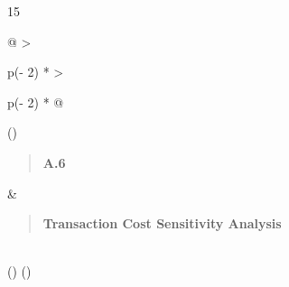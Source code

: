 \documentclass[
]{article}
\begin{document}
15

\begin{longtable}[]{@{}
  >{\raggedright\arraybackslash}p{(\columnwidth - 2\tabcolsep) * }
  >{\raggedright\arraybackslash}p{(\columnwidth - 2\tabcolsep) * }@{}}
\toprule()
\begin{minipage}[b]{\linewidth}\raggedright
\begin{quote}
\textbf{A.6}
\end{quote}
\end{minipage} & \begin{minipage}[b]{\linewidth}\raggedright
\begin{quote}
\textbf{Transaction Cost Sensitivity Analysis}
\end{quote}
\end{minipage} \\
\midrule()
\endhead
\bottomrule()
\end{longtable}
\end{document}
